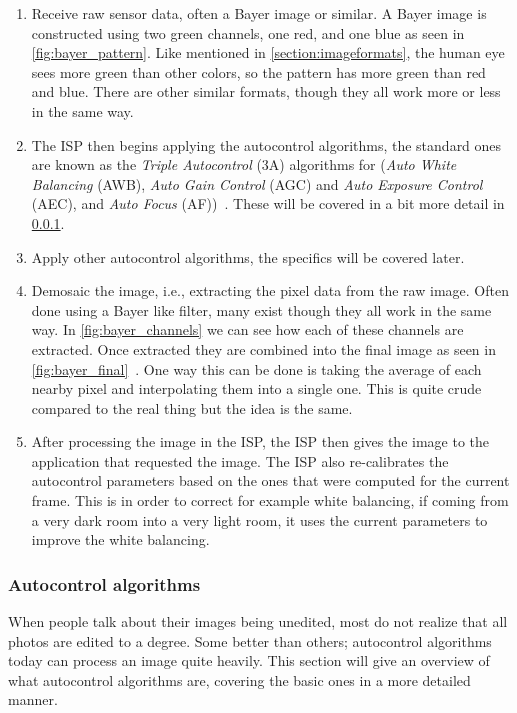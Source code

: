 \begin{enumerate}
    \item Receive raw sensor data, often a Bayer image or similar. A Bayer
        image is constructed using two green channels, one red, and one blue as
        seen in \cref{fig:bayer_pattern}. Like mentioned in \cref{section:imageformats},
        the human eye sees more green than other colors, so the pattern has
        more green than red and blue. There are other similar formats, though
        they all work more or less in the same way.

    \item The ISP then begins applying the autocontrol algorithms, the standard
        ones are known as the \textit{Triple Autocontrol} (3A) algorithms for
        (\textit{Auto White Balancing} (AWB), \textit{Auto Gain Control} (AGC)
        and \textit{Auto Exposure Control} (AEC), and \textit{Auto Focus}
        (AF))~\cite{libcameraStack}. These will be covered in a bit more detail
        in \cref{section:autocontrol}.

    \item Apply other autocontrol algorithms, the specifics will be covered later.

    \item Demosaic the image, i.e., extracting the pixel data from the raw
        image. Often done using a Bayer like filter, many exist though
        they all work in the same way. In \cref{fig:bayer_channels} we can see
        how each of these channels are extracted. Once extracted they are
        combined into the final image as seen in \cref{fig:bayer_final}~\cite{li2008image, libcameraStack}. One
        way this can be done is taking the average of each nearby pixel and
        interpolating them into a single one. This is quite crude compared to
        the real thing but the idea is the same.

    \item After processing the image in the ISP, the ISP then gives the image
        to the application that requested the image. The ISP also re-calibrates
        the autocontrol parameters based on the ones that were computed for the
        current frame. This is in order to correct for example white balancing,
        if coming from a very dark room into a very light room, it uses the
        current parameters to improve the white balancing.

\end{enumerate}

\subsubsection{Autocontrol algorithms} \label{section:autocontrol}
When people talk about their images being unedited, most do not realize that all
photos are edited to a degree. Some better than others; autocontrol algorithms
today can process an image quite heavily. This section will give an overview of
what autocontrol algorithms are, covering the basic ones in a more detailed
manner.


